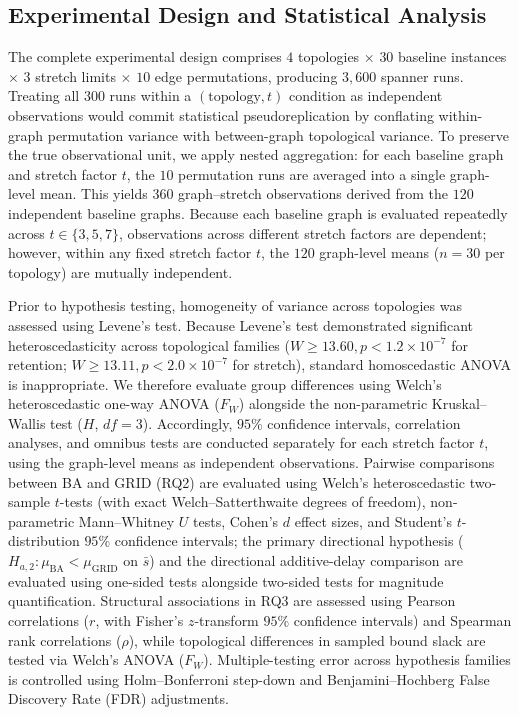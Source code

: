 \documentclass[conference]{IEEEtran}
\begin{document}
\subsection{Experimental Design and Statistical Analysis}
The complete experimental design comprises $4$ topologies $\times$ $30$ baseline instances $\times$ $3$ stretch limits $\times$ $10$ edge permutations, producing $3,600$ spanner runs. Treating all $300$ runs within a $(\text{topology}, t)$ condition as independent observations would commit statistical pseudoreplication by conflating within-graph permutation variance with between-graph topological variance.
To preserve the true observational unit, we apply nested aggregation: for each baseline graph and stretch factor $t$, the $10$ permutation runs are averaged into a single graph-level mean. This yields $360$ graph--stretch observations derived from the $120$ independent baseline graphs. Because each baseline graph is evaluated repeatedly across $t \in \{3, 5, 7\}$, observations across different stretch factors are dependent; however, within any fixed stretch factor $t$, the $120$ graph-level means ($n = 30$ per topology) are mutually independent.

Prior to hypothesis testing, homogeneity of variance across topologies was assessed using Levene's test. Because Levene's test demonstrated significant heteroscedasticity across topological families ($W \ge 13.60, p < 1.2 \times 10^{-7}$ for retention; $W \ge 13.11, p < 2.0 \times 10^{-7}$ for stretch), standard homoscedastic ANOVA is inappropriate. We therefore evaluate group differences using Welch’s heteroscedastic one-way ANOVA ($F_W$) \cite{ref27} alongside the non-parametric Kruskal--Wallis test ($H$, $df = 3$). Accordingly, $95\%$ confidence intervals, correlation analyses, and omnibus tests are conducted separately for each stretch factor $t$, using the graph-level means as independent observations. Pairwise comparisons between BA and GRID (RQ2) are evaluated using Welch's heteroscedastic two-sample $t$-tests (with exact Welch--Satterthwaite degrees of freedom), non-parametric Mann--Whitney $U$ tests, Cohen's $d$ effect sizes, and Student's $t$-distribution $95\%$ confidence intervals; the primary directional hypothesis ($H_{a,2}: \mu_{\mathrm{BA}} < \mu_{\mathrm{GRID}}$ on $\bar{s}$) and the directional additive-delay comparison are evaluated using one-sided tests alongside two-sided tests for magnitude quantification. Structural associations in RQ3 are assessed using Pearson correlations ($r$, with Fisher's $z$-transform $95\%$ confidence intervals) and Spearman rank correlations ($\rho$), while topological differences in sampled bound slack are tested via Welch's ANOVA ($F_W$). Multiple-testing error across hypothesis families is controlled using Holm--Bonferroni step-down and Benjamini--Hochberg False Discovery Rate (FDR) adjustments.
\end{document}
